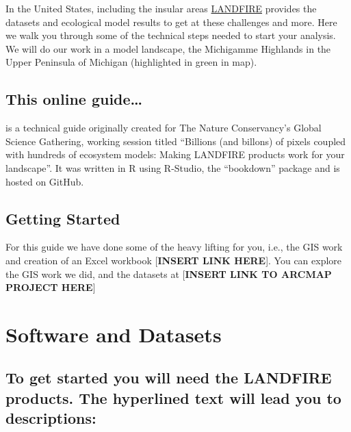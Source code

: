 \documentclass[
]{book}
\begin{document}
In the United States, including the insular areas \href{www.landfire.gov}{LANDFIRE} provides the datasets and ecological model results to get at these challenges and more. Here we walk you through some of the technical steps needed to start your analysis. We will do our work in a model landscape, the Michigamme Highlands in the Upper Peninsula of Michigan (highlighted in green in map).

\hypertarget{this-online-guide}{%
\section{This online guide\ldots{}}\label{this-online-guide}}

is a technical guide originally created for The Nature Conservancy's Global Science Gathering, working session titled ``Billions (and billons) of pixels coupled with hundreds of ecosystem models: Making LANDFIRE products work for your landscape''. It was written in R using R-Studio, the ``bookdown'' package and is hosted on GitHub.

\hypertarget{getting-started}{%
\section{Getting Started}\label{getting-started}}

For this guide we have done some of the heavy lifting for you, i.e., the GIS work and creation of an Excel workbook {[}\textbf{INSERT LINK HERE}{]}. You can explore the GIS work we did, and the datasets at {[}\textbf{INSERT LINK TO ARCMAP PROJECT HERE}{]}

\hypertarget{softAndData}{%
\chapter{Software and Datasets}\label{softAndData}}

\hypertarget{to-get-started-you-will-need-the-landfire-products.-the-hyperlined-text-will-lead-you-to-descriptions}{%
\section{To get started you will need the LANDFIRE products. The hyperlined text will lead you to descriptions:}\label{to-get-started-you-will-need-the-landfire-products.-the-hyperlined-text-will-lead-you-to-descriptions}}
\end{document}
